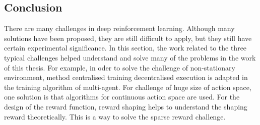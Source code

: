 \subsection{Conclusion}
There are many challenges in deep reinforcement learning. Although many solutions have been proposed, they are still difficult to apply, but they still have certain experimental significance. In this section, the work related to the three typical challenges helped understand and solve many of the problems in the work of this thesis. For example, in oder to solve the challenge of non-stationary environment, method centralised training decentralised execution is adapted in the training algorithm of multi-agent. For challenge of huge size of action space, one solution is that algorithms for continuous action space are used. For the design of the reward function, reward shaping helps to understand the shaping reward theoretically. This is a way to solve the sparse reward challenge. 